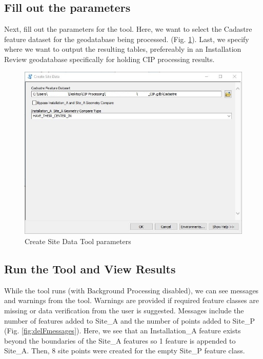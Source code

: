 \documentclass[openany]{book}
\theoremstyle{definition}
\theoremstyle{definition}
\theoremstyle{definition}
\theoremstyle{remark}
\begin{document}
\subsection{Fill out the parameters}\label{fill-out-the-parameters}

Next, fill out the parameters for the tool. Here, we want to select the
Cadastre feature dataset for the geodatabase being processed. (Fig.
\ref{fig:csdparams}). Last, we specify where we want to output the
resulting tables, prefereably in an Installation Review geodatabase
specifically for holding CIP processing results.\\

\begin{figure}[H]

{\centering \includegraphics{figures/csd-params} 

}

\caption{Create Site Data Tool parameters}\label{fig:csdparams}
\end{figure}

\subsection{Run the Tool and View
Results}\label{run-the-tool-and-view-results}

While the tool runs (with Background Processing disabled), we can see
messages and warnings from the tool. Warnings are provided if required
feature classes are missing or data verification from the user is
suggested. Messages include the number of features added to Site\_A and
the number of points added to Site\_P (Fig. \ref{fig:delFmessages}).
Here, we see that an Installation\_A feature exists beyond the
boundaries of the Site\_A features so 1 feature is appended to Site\_A.
Then, 8 site points were created for the empty Site\_P feature class.
\end{document}
